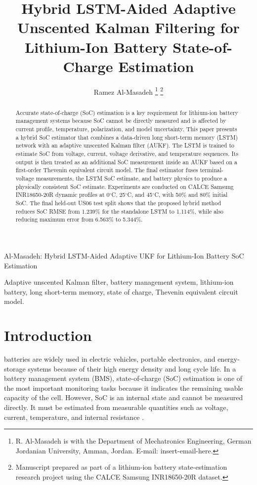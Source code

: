 \documentclass[lettersize,journal]{IEEEtran}
\begin{document}
\title{Hybrid LSTM-Aided Adaptive Unscented Kalman Filtering for Lithium-Ion Battery State-of-Charge Estimation}

\author{Ramez Al-Masadeh%
\thanks{R. Al-Masadeh is with the Department of Mechatronics Engineering, German Jordanian University, Amman, Jordan. E-mail: insert-email-here.}%
\thanks{Manuscript prepared as part of a lithium-ion battery state-estimation research project using the CALCE Samsung INR18650-20R dataset.}}

%
{Al-Masadeh: Hybrid LSTM-Aided Adaptive UKF for Lithium-Ion Battery SoC Estimation}

\maketitle

\begin{abstract}
Accurate state-of-charge (SoC) estimation is a key requirement for lithium-ion battery management systems because SoC cannot be directly measured and is affected by current profile, temperature, polarization, and model uncertainty. This paper presents a hybrid SoC estimator that combines a data-driven long short-term memory (LSTM) network with an adaptive unscented Kalman filter (AUKF). The LSTM is trained to estimate SoC from voltage, current, voltage derivative, and temperature sequences. Its output is then treated as an additional SoC measurement inside an AUKF based on a first-order Thevenin equivalent circuit model. The final estimator fuses terminal-voltage measurements, the LSTM SoC estimate, and battery physics to produce a physically consistent SoC estimate. Experiments are conducted on CALCE Samsung INR18650-20R dynamic profiles at 0$^\circ$C, 25$^\circ$C, and 45$^\circ$C, with 50\% and 80\% initial SoC. The final held-out US06 test split shows that the proposed hybrid method reduces SoC RMSE from 1.239\% for the standalone LSTM to 1.114\%, while also reducing maximum error from 6.563\% to 5.344\%.
\end{abstract}

\begin{IEEEkeywords}
Adaptive unscented Kalman filter, battery management system, lithium-ion battery, long short-term memory, state of charge, Thevenin equivalent circuit model.
\end{IEEEkeywords}

\section{Introduction}
 batteries are widely used in electric vehicles, portable electronics, and energy-storage systems because of their high energy density and long cycle life. In a battery management system (BMS), state-of-charge (SoC) estimation is one of the most important monitoring tasks because it indicates the remaining usable capacity of the cell. However, SoC is an internal state and cannot be measured directly. It must be estimated from measurable quantities such as voltage, current, temperature, and internal resistance \cite{wang2023battery}.
\end{document}

